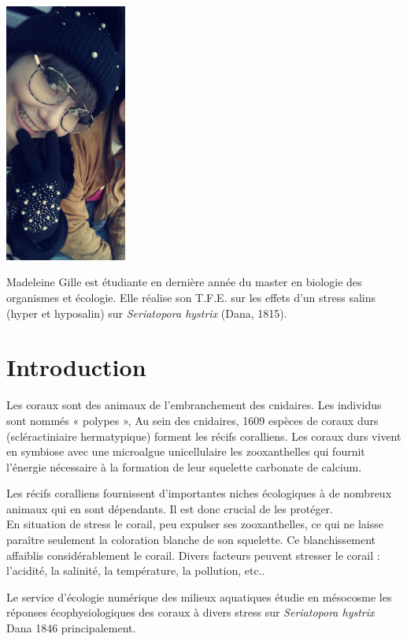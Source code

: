 \documentclass[]{report}
\begin{document}
\includegraphics[width=4.00000cm]{../image/madeleine.jpg}

Madeleine Gille est étudiante en dernière année du master en biologie
des organismes et écologie. Elle réalise son T.F.E. sur les effets d'un
stress salins (hyper et hyposalin) sur \emph{Seriatopora hystrix} (Dana,
1815).

\chapter{Introduction}\label{introduction}

Les coraux sont des animaux de l'embranchement des cnidaires. Les
individus sont nommés « polypes », Au sein des cnidaires, 1609 espèces
de coraux durs (scléractiniaire hermatypique) forment les récifs
coralliens. Les coraux durs vivent en symbiose avec une microalgue
unicellulaire les zooxanthelles qui fournit l'énergie nécessaire à la
formation de leur squelette carbonate de calcium.

Les récifs coralliens fournissent d'importantes niches écologiques à de
nombreux animaux qui en sont dépendants. Il est donc crucial de les
protéger.\\
En situation de stress le corail, peu expulser ses zooxanthelles, ce qui
ne laisse paraître seulement la coloration blanche de son squelette. Ce
blanchissement affaiblis considérablement le corail. Divers facteurs
peuvent stresser le corail : l'acidité, la salinité, la température, la
pollution, etc..

Le service d'écologie numérique des milieux aquatiques étudie en
mésocosme les réponses écophysiologiques des coraux à divers stress sur
\emph{Seriatopora hystrix} Dana 1846 principalement.
\end{document}

